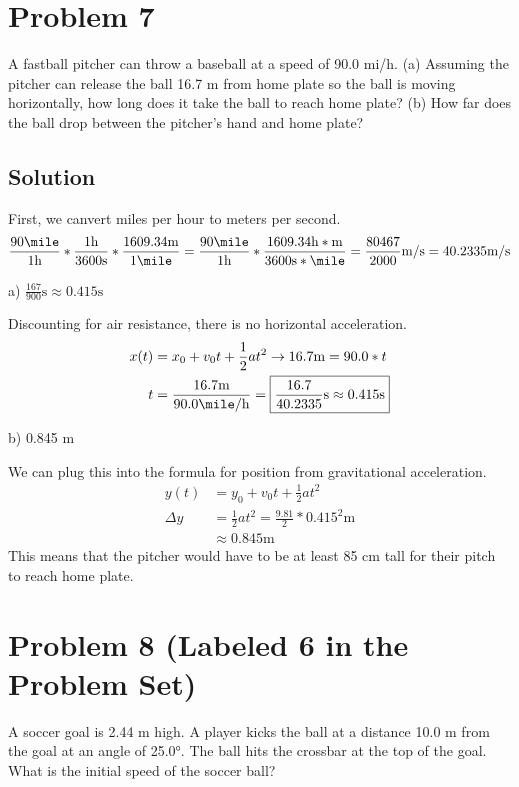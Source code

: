 \documentclass[12pt]{article}
\begin{document}
\pagebreak
\section*{Problem 7}
A fastball pitcher can throw a baseball at a speed of 90.0 mi/h. (a) Assuming the pitcher can release the ball 16.7 m from home plate so the ball is moving horizontally, how long does it take the ball to reach home plate? (b) How far does the ball drop between the pitcher's hand and home plate?

\subsection*{Solution}

First, we canvert miles per hour to meters per second.
\begin{equation*}
    \frac{90\unit{\mile}}{1\unit{\hour}} * \frac{1\unit{\hour}}{3600\unit{\second}} * \frac{1609.34\unit{\meter}}{1\unit{\mile}} 
    = \frac{90\unit{\mile}}{1\unit{\hour}} * \frac{1609.34\unit{\hour*\meter}}{3600\unit{\second*\mile}}
    = \frac{80467}{2000}\unit{\meter/\second} = 40.2335 \unit{\meter/\second}
\end{equation*}

a) $\frac{167}{900}\unit{\second} \approx 0.415 \unit{\second}$

Discounting for air resistance, there is no horizontal acceleration.
\begin{align*}
    x(t) &= x_0 + v_0 t + \frac{1}{2}at^2 \rightarrow 16.7\unit{\meter} = 90.0*t\\
    t &= \frac{16.7\unit{\meter}}{90.0\unit{\mile/\hour}} = \boxed{\frac{16.7}{40.2335}\unit{\second} \approx 0.415 \unit{\second}}
\end{align*}

b) 0.845 m

We can plug this into the formula for position from gravitational acceleration.
\begin{align*}
    y(t) &= y_0 + v_0 t + \frac{1}{2}at^2\\
    \Delta y &= \frac{1}{2}at^2 = \frac{9.81}{2}*0.415^2 \unit{\meter}\\
            &\approx \boxed{0.845 \unit{\meter}}
\end{align*}
This means that the pitcher would have to be at least 85 cm tall for their pitch to reach home plate.

\pagebreak
\section*{Problem 8 (Labeled 6 in the Problem Set)}
A soccer goal is 2.44 m high. A player kicks the ball at a distance 10.0 m from the goal at an angle of 25.0°. The ball hits the crossbar at the top of the goal. What is the initial speed of the soccer ball?
\end{document}
